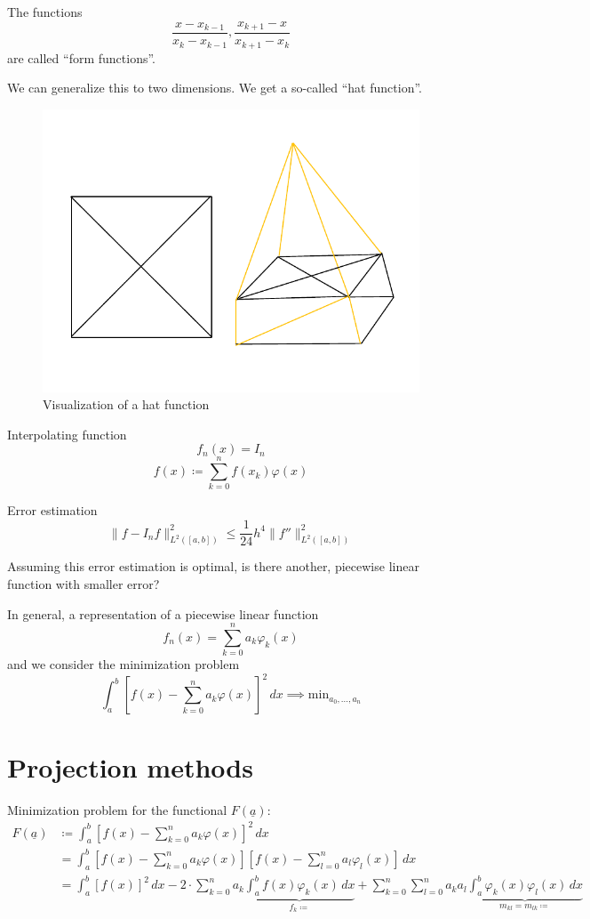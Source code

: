 \documentclass{article}
\begin{document}
The functions
\[ \frac{x - x_{k-1}}{x_k - x_{k-1}}, \frac{x_{k+1} - x}{x_{k+1} - x_k} \]
are called \enquote{form functions}.

We can generalize this to two dimensions. We get a so-called \enquote{hat function}.

\begin{figure}[t]
  \begin{center}
    \includegraphics{img/hat_function.pdf}
    \caption{Visualization of a hat function}
  \end{center}
\end{figure}

Interpolating function
\[ f_n(x) = I_n \]
\[ f(x) \coloneqq \sum_{k=0}^n f(x_k) \varphi(x) \]

Error estimation
\[ \| f - I_n f \|^2_{L^2([a,b])} \leq \frac{1}{24} h^4 \| f'' \|^2_{L^2([a,b])} \]

Assuming this error estimation is optimal, is there another, piecewise linear function with smaller error?

In general, a representation of a piecewise linear function
\[ f_n(x) = \sum_{k=0}^n a_k \varphi_k(x) \]
and we consider the minimization problem
\[ \int_a^b \left[ f(x) - \sum_{k=0}^n a_k \varphi(x) \right]^2 \, dx \implies \text{min}_{a_0, \ldots, a_n} \]


\section{Projection methods} %

Minimization problem for the functional $F(\underline{a})$:
\begin{align*}
  F(\underline{a}) &\coloneqq \int_a^b \left[ f(x) - \sum_{k=0}^n a_k \varphi(x) \right]^2 \, dx \\
        &= \int_a^b \left[f(x) - \sum_{k=0}^n a_k \varphi(x) \right] \left[ f(x) - \sum_{l=0}^n a_l \varphi_l(x) \right]\, dx \\
        &= \int_a^b \left[f(x)\right]^2 \, dx - 2 \cdot \sum_{k=0}^n a_k \underbrace{\int_a^b f(x) \varphi_k(x) \, dx}_{f_k \coloneqq}
           + \sum_{k=0}^n \sum_{l=0}^n a_k a_l \underbrace{\int_a^b \varphi_k(x) \varphi_l(x) \, dx}_{m_{kl} = m_{lk} \coloneqq}
\end{align*}
\end{document}
